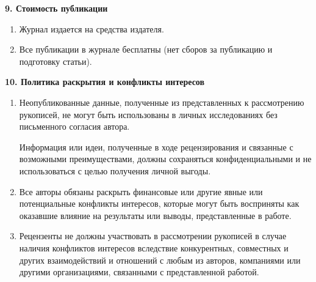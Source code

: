 \smallskip



\pagebreak



\noindent

{\bf 9. Стоимость публикации}



\begin{enumerate}

\item[1.]

Журнал издается на средства издателя.

\item[2.]

Все публикации в журнале бесплатны (нет сборов за публикацию и подготовку статьи).

\end{enumerate}





\noindent

{\bf 10. Политика раскрытия и конфликты интересов}



\begin{enumerate}

\item[1.]

Неопубликованные данные, полученные из представленных к рассмотрению рукописей, не могут быть использованы в личных исследованиях без письменного согласия автора.

Информация или идеи, полученные в ходе рецензирования и связанные с возможными преимуществами, должны сохраняться конфиденциальными и не использоваться с целью получения личной выгоды.

\item[2.]

Все авторы обязаны раскрыть финансовые или другие явные или потенциальные конфликты интересов, которые могут быть восприняты как оказавшие влияние на результаты или выводы, представленные в работе.

\item[3.]

Рецензенты не должны участвовать в рассмотрении рукописей в случае наличия конфликтов интересов вследствие конкурентных, совместных и других взаимодействий и отношений с любым из авторов, компаниями или другими организациями, связанными с представленной работой.

\end{enumerate}



